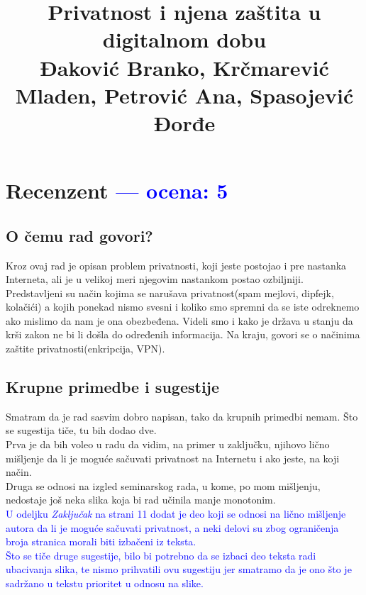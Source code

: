 \documentclass[a4paper]{report}
\newcommand{\odgovor}[1]{\textcolor{blue}{#1}}
\begin{document}
\title{Privatnost i njena zaštita u digitalnom dobu\\ \small{Đaković Branko, Krčmarević Mladen, Petrović Ana, Spasojević Đorđe}}

\maketitle

\tableofcontents


\chapter{Recenzent \odgovor{--- ocena: 5} }


\section{O čemu rad govori?}
Kroz ovaj rad je opisan problem privatnosti, koji jeste postojao i pre nastanka Interneta, ali je u velikoj meri njegovim nastankom postao ozbiljniji. Predstavljeni su način kojima se narušava privatnost(spam mejlovi, dipfejk, kolačići) a kojih ponekad nismo svesni i koliko smo spremni da se iste odreknemo ako mislimo da nam je ona obezbeđena. Videli smo i kako je država u stanju da krši zakon ne bi li došla do određenih informacija. Na kraju, govori se o načinima zaštite privatnosti(enkripcija, VPN).

\section{Krupne primedbe i sugestije}
Smatram da je rad sasvim dobro napisan, tako da krupnih primedbi nemam. Što se sugestija tiče, tu bih dodao dve.\\
Prva je da bih voleo u radu da vidim, na primer u zaključku, njihovo lično mišljenje da li je moguće sačuvati privatnost na Internetu i ako jeste, na koji način.\\
Druga se odnosi na izgled seminarskog rada, u kome, po mom mišljenju, nedostaje još neka slika koja bi rad učinila manje monotonim.
\\
\odgovor{U odeljku \emph{Zaključak} na strani 11 dodat je deo koji se odnosi na lično mišljenje autora da li je moguće sačuvati privatnost, a neki delovi su zbog ograničenja broja stranica morali biti izbačeni iz teksta. \\ Što se tiče druge sugestije, bilo bi potrebno da se izbaci deo teksta radi ubacivanja slika, te nismo prihvatili ovu sugestiju jer smatramo da je ono što je sadržano u tekstu prioritet u odnosu na slike.}
\end{document}

